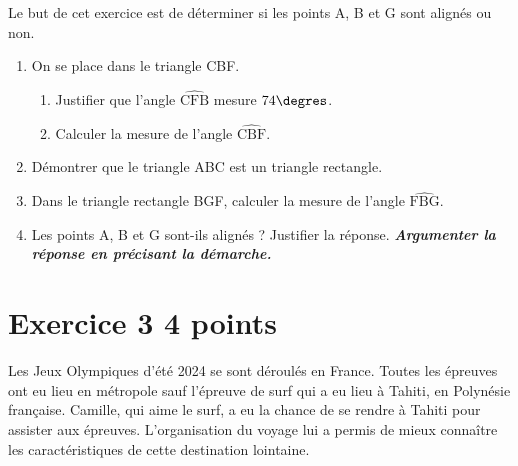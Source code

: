 \documentclass[12pt,a4paper,french]{article}
\begin{document}
\medskip
Le but de cet exercice est de déterminer si les points A, B et G sont alignés ou non.

\begin{enumerate}
\item On se place dans le triangle CBF.
\begin{enumerate}[label=\textbf{\alph*.}]
\item Justifier que l'angle $\widehat{\text{CFB}}$ mesure $74\degres$.
\item Calculer la mesure de l'angle $\widehat{\text{CBF}}$.
\end{enumerate}
\item Démontrer que le triangle ABC est un triangle rectangle.
\item Dans le triangle rectangle BGF, calculer la mesure de l'angle $\widehat{\text{FBG}}$.
\item Les points A, B et G sont-ils alignés ? Justifier la réponse. \textbf{\textit{Argumenter la réponse en précisant la démarche.}}
\end{enumerate}


\newpage
\section*{Exercice 3 \hfill 4 points}

Les Jeux Olympiques d'été 2024 se sont déroulés en France. Toutes les épreuves ont eu lieu en métropole sauf l'épreuve de surf qui a eu lieu à Tahiti, en Polynésie française. Camille, qui aime le surf, a eu la chance de se rendre à Tahiti pour assister aux épreuves. L'organisation du voyage lui a permis de mieux connaître les caractéristiques de cette destination lointaine.
\end{document}
